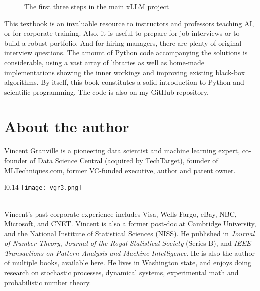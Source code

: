 \documentclass[oneside,10pt]{book}
\begin{document}
\begin{figure}[H]
\centering
{}   
\caption{The first three steps in the main xLLM project}
\label{fig:scgh4aslo}
\end{figure}


This textbook is an invaluable resource to instructors and professors teaching AI, or for corporate training. Also, it is useful to prepare for job interviews or to build a robust portfolio. And for hiring managers, there are plenty of original interview questions. The amount of Python code accompanying the solutions is considerable, using a vast array of libraries as well as home-made implementations showing the inner workings and improving existing black-box algorithms. By itself, this book constitutes a solid introduction to Python and scientific programming. The code is also on my GitHub repository.



\section*{About the author}

Vincent Granville is a pioneering data scientist and machine learning expert, co-founder of Data Science Central  (acquired by TechTarget), founder of \href{https://mltechniques.com/}{MLTechniques.com}, former VC-funded executive, author and patent owner.
\begin{wrapfigure}{l}{0.14\textwidth}
\vspace{-1ex}
\texttt{[image: vgr3.png]} 
\end{wrapfigure}
\vspace{-2ex}\quad \\
\noindent Vincent’s past corporate experience includes Visa, Wells Fargo, eBay, NBC, Microsoft, and CNET. 
Vincent is also a former post-doc at Cambridge University, and the National Institute of Statistical Sciences (NISS).  
He  published in {\em Journal of Number Theory}, {\em Journal of the Royal Statistical Society} (Series B), and {\em IEEE Transactions on Pattern Analysis and Machine Intelligence}. He is also the author of multiple books, available \href{https://mltechniques.com/resources/}{here}. He lives  in Washington state, and enjoys doing research on stochastic processes, dynamical systems, experimental math and probabilistic number theory.
\end{document}
